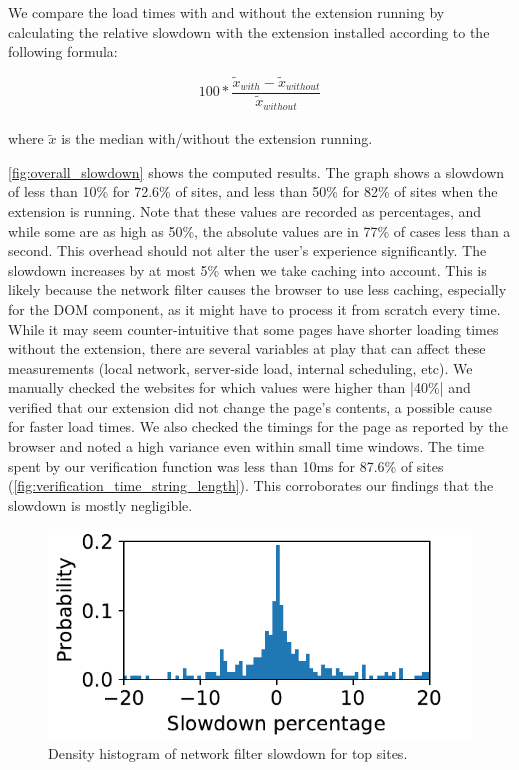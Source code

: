 We compare the load times with and without the extension running by calculating the relative slowdown with the extension installed according to the following formula:

\begin{equation*}
100*\frac{\tilde{x}_{with}-\tilde{x}_{without}}{\tilde{x}_{without}}
\end{equation*}
\\
where $\tilde{x}$ is the median with/without the extension running.

\autoref{fig:overall_slowdown} shows the computed results. The graph shows a slowdown of less than 10\% for 72.6\% of sites, and less than 50\% for 82\% of sites when the extension is running. Note that these values are recorded as percentages, and while some are as high as 50\%, the absolute values are in 77\% of cases less than a second. This overhead should not alter the user's experience significantly. The slowdown increases by at most 5\% when we take caching into account. This is likely because the network filter causes the browser to use less caching, especially for the DOM component, as it might have to process it from scratch every time. While it may seem counter-intuitive that some pages have shorter loading times without the extension, there are several variables at play that can affect these measurements (local network, server-side load, internal scheduling, etc). We manually checked the websites for which values were higher than |40\%| and verified that our extension did not change the page's contents, a possible cause for faster load times. We also checked the timings for the page as reported by the browser and noted a high variance even within small time windows. The time spent by our verification function was less than 10ms for 87.6\% of sites (\autoref{fig:verification_time_string_length}). This corroborates our findings that the slowdown is mostly negligible.

\iffalse
\begin{figure}[h]
	\includegraphics[scale=0.5]{results/density_histogram_filter_slowdown_small.pdf}
	\caption{Density histogram of network filter slowdown for top sites.}
	\label{fig:histogram_slowdown}
\end{figure}


